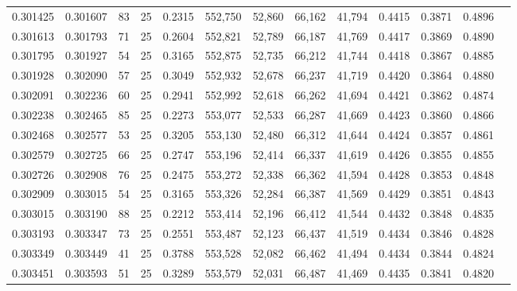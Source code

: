 \begin{tabular}{rrrrrrrrrrrrr}
0.301425 & 0.301607 &    83 &  25 &                                     0.2315 & 552,750 &  52,860 &  66,162 &  41,794 & 0.4415 & 0.3871 & 0.4896 \\
0.301613 & 0.301793 &    71 &  25 &                                     0.2604 & 552,821 &  52,789 &  66,187 &  41,769 & 0.4417 & 0.3869 & 0.4890 \\
0.301795 & 0.301927 &    54 &  25 &                                     0.3165 & 552,875 &  52,735 &  66,212 &  41,744 & 0.4418 & 0.3867 & 0.4885 \\
0.301928 & 0.302090 &    57 &  25 &                                     0.3049 & 552,932 &  52,678 &  66,237 &  41,719 & 0.4420 & 0.3864 & 0.4880 \\
0.302091 & 0.302236 &    60 &  25 &                                     0.2941 & 552,992 &  52,618 &  66,262 &  41,694 & 0.4421 & 0.3862 & 0.4874 \\
0.302238 & 0.302465 &    85 &  25 &                                     0.2273 & 553,077 &  52,533 &  66,287 &  41,669 & 0.4423 & 0.3860 & 0.4866 \\
0.302468 & 0.302577 &    53 &  25 &                                     0.3205 & 553,130 &  52,480 &  66,312 &  41,644 & 0.4424 & 0.3857 & 0.4861 \\
0.302579 & 0.302725 &    66 &  25 &                                     0.2747 & 553,196 &  52,414 &  66,337 &  41,619 & 0.4426 & 0.3855 & 0.4855 \\
0.302726 & 0.302908 &    76 &  25 &                                     0.2475 & 553,272 &  52,338 &  66,362 &  41,594 & 0.4428 & 0.3853 & 0.4848 \\
0.302909 & 0.303015 &    54 &  25 &                                     0.3165 & 553,326 &  52,284 &  66,387 &  41,569 & 0.4429 & 0.3851 & 0.4843 \\
0.303015 & 0.303190 &    88 &  25 &                                     0.2212 & 553,414 &  52,196 &  66,412 &  41,544 & 0.4432 & 0.3848 & 0.4835 \\
0.303193 & 0.303347 &    73 &  25 &                                     0.2551 & 553,487 &  52,123 &  66,437 &  41,519 & 0.4434 & 0.3846 & 0.4828 \\
0.303349 & 0.303449 &    41 &  25 &                                     0.3788 & 553,528 &  52,082 &  66,462 &  41,494 & 0.4434 & 0.3844 & 0.4824 \\
0.303451 & 0.303593 &    51 &  25 &                                     0.3289 & 553,579 &  52,031 &  66,487 &  41,469 & 0.4435 & 0.3841 & 0.4820 \\

\end{tabular}
